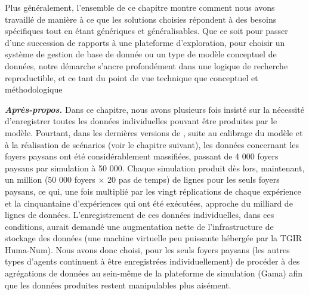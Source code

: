 Plus généralement, l'ensemble de ce chapitre montre comment nous avons travaillé de manière à ce que les solutions choisies répondent à des besoins spécifiques tout en étant génériques et généralisables.
Que ce soit pour passer d'une succession de rapports à une plateforme d'exploration, pour choisir un système de gestion de base de donnée ou un type de modèle conceptuel de données, notre démarche s'ancre profondément dans une logique de recherche reproductible, et ce tant du point de vue technique que conceptuel et méthodologique

\vfill
{}
\begin{mdframed}[backgroundcolor=black!5,footnoteinside=false]
	\textbf{\textit{Après-propos.}}
Dans ce chapitre, nous avons plusieurs fois insisté sur la nécessité d'enregistrer toutes les données individuelles pouvant être produites par le modèle.
Pourtant, dans les dernières versions de \simfeodal{}, suite au calibrage du modèle et à la réalisation de scénarios (voir le chapitre suivant), les données concernant les foyers paysans ont été considérablement massifiées, passant de 4 000 foyers paysans par simulation à 50 000.
Chaque simulation produit dès lors, maintenant, un million (50 000 foyers × 20 pas de temps) de lignes pour les seuls foyers paysans, ce qui, une fois multiplié par les vingt réplications de chaque expérience et la cinquantaine d'expériences qui ont été exécutées, approche du milliard de lignes de données.
L'enregistrement de ces données individuelles, dans ces conditions, aurait demandé une augmentation nette de l'infrastructure de stockage des données (une machine virtuelle peu puissante hébergée par la TGIR Huma-Num).
Nous avons donc choisi, pour les seuls foyers paysans (les autres types d'agents continuent à être enregistrées individuellement) de procéder à des agrégations de données au sein-même de la plateforme de simulation (Gama) afin que les données produites restent manipulables plus aisément.
\end{mdframed}